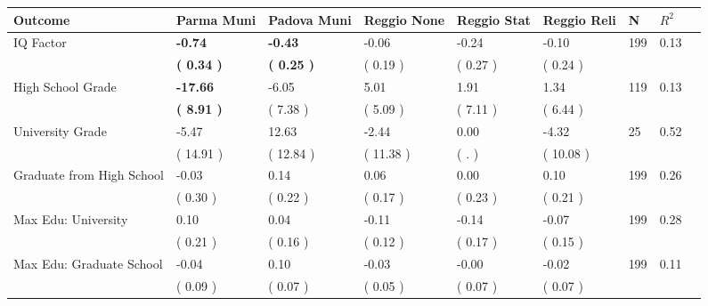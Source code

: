 \begin{tabular}{L{6.2cm} C{1.8cm} C{1.8cm} C{1.8cm} C{1.8cm} C{1.8cm} C{1.8cm} C{0.3cm} C{0.3cm}}
\toprule
 \textbf{Outcome} & \textbf{Parma Muni} & \textbf{Padova Muni} & \textbf{Reggio None} & \textbf{Reggio Stat} & \textbf{Reggio Reli} & \textbf{N} & \textbf{$ R^2$} \\
\midrule
IQ Factor & \textbf{    -0.74} & \textbf{    -0.43} &     -0.06 &     -0.24 &     -0.10  & 199 &       0.13 \\ 
 & \textbf{(     0.34 )} & \textbf{(     0.25 )} & (     0.19 ) & (     0.27 ) & (     0.24 )  & \\
High School Grade & \textbf{   -17.66} &     -6.05 &      5.01 &      1.91 &      1.34  & 119 &       0.13 \\ 
 & \textbf{(     8.91 )} & (     7.38 ) & (     5.09 ) & (     7.11 ) & (     6.44 )  & \\
University Grade &     -5.47 &     12.63 &     -2.44 &      0.00 &     -4.32  & 25 &       0.52 \\ 
 & (    14.91 ) & (    12.84 ) & (    11.38 ) & (        . ) & (    10.08 )  & \\
Graduate from High School &     -0.03 &      0.14 &      0.06 &      0.00 &      0.10  & 199 &       0.26 \\ 
 & (     0.30 ) & (     0.22 ) & (     0.17 ) & (     0.23 ) & (     0.21 )  & \\
Max Edu: University &      0.10 &      0.04 &     -0.11 &     -0.14 &     -0.07  & 199 &       0.28 \\ 
 & (     0.21 ) & (     0.16 ) & (     0.12 ) & (     0.17 ) & (     0.15 )  & \\
Max Edu: Graduate School &     -0.04 &      0.10 &     -0.03 &     -0.00 &     -0.02  & 199 &       0.11 \\ 
 & (     0.09 ) & (     0.07 ) & (     0.05 ) & (     0.07 ) & (     0.07 )  & \\
\bottomrule
\end{tabular}
